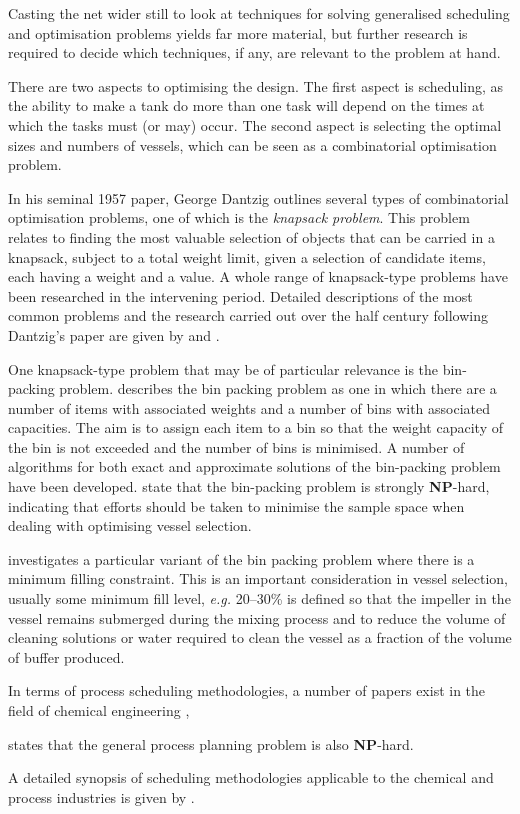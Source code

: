Casting the net wider still to look at techniques for solving generalised
scheduling and optimisation problems yields far more material, but further 
research is required to decide which techniques, if any, are relevant to the 
problem at hand.

There are two aspects to optimising the design.  The first aspect is scheduling,
as the ability to make a tank do more than one task will depend on the times
at which the tasks must (or may) occur.  The second aspect is selecting the
optimal sizes and numbers of vessels, which can be seen as a combinatorial
optimisation problem.

In his seminal 1957 paper, George Dantzig \nocite{Dantzig:1957} outlines several
types of combinatorial optimisation problems, one of which is the
\emph{knapsack problem}.  This problem relates to finding the most valuable
selection of objects that can be carried in a knapsack, subject to a total
weight limit, given a selection of candidate items, each having a weight and a 
value.
A whole range of knapsack-type problems have been researched in the intervening
period.  Detailed descriptions of the most common problems and the research 
carried out over the half century following Dantzig's paper are given by 
\citet{Korte:2012} and \citet{Martello:1990}.

One knapsack-type problem that may be of particular relevance is the bin-packing
problem.  \citet{Martello:1990} describes the bin packing problem as one in
which there are a number of items with associated weights and a number of bins
with associated capacities.  The aim is to assign each item to a bin so that the
weight capacity of the bin is not exceeded and the number of bins is minimised.
A number of algorithms for both exact and approximate solutions of the
bin-packing problem have been developed. \citet{Korte:2012} state that the
bin-packing problem is strongly \textbf{NP}-hard, indicating that efforts
should be taken to minimise the sample space when dealing with optimising vessel
selection.

\citet{Bettinelli:2010} investigates a particular variant of the bin packing
problem where there is a minimum filling constraint.  This is an important
consideration in vessel selection, usually some minimum fill level,
\textit{e.g.} 20--30\% is defined so that the impeller in the vessel remains
submerged during the mixing process and to reduce the volume of cleaning
solutions or water required to clean the vessel as a fraction of the volume of 
buffer produced.

In terms of process scheduling methodologies, a number of papers exist in the 
field of chemical engineering \citep{Ahmed:2000},

\citet{Ahmed:2000} states that the general process planning problem is also
\textbf{NP}-hard.

A detailed synopsis of scheduling methodologies applicable to the chemical 
and process industries is given by \citet{Harjunkoski:2014}.
